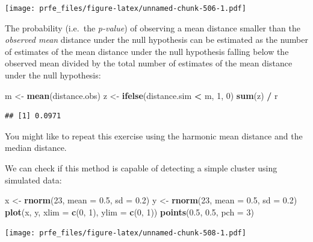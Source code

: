 \documentclass[12pt,a4paper]{book}
\newenvironment{Shaded}{\begin{snugshade}}{\end{snugshade}}
\newcommand{\DataTypeTok}[1]{\textcolor[rgb]{0.13,0.29,0.53}{#1}}
\newcommand{\DecValTok}[1]{\textcolor[rgb]{0.00,0.00,0.81}{#1}}
\newcommand{\FloatTok}[1]{\textcolor[rgb]{0.00,0.00,0.81}{#1}}
\newcommand{\KeywordTok}[1]{\textcolor[rgb]{0.13,0.29,0.53}{\textbf{#1}}}
\newcommand{\NormalTok}[1]{#1}
\newcommand{\OperatorTok}[1]{\textcolor[rgb]{0.81,0.36,0.00}{\textbf{#1}}}
\newcommand{\StringTok}[1]{\textcolor[rgb]{0.31,0.60,0.02}{#1}}
\theoremstyle{definition}
\theoremstyle{definition}
\theoremstyle{definition}
\theoremstyle{remark}
\begin{document}
\texttt{[image: prfe\_files/figure-latex/unnamed-chunk-506-1.pdf]}

The probability (i.e.~the \emph{p-value}) of observing a mean distance
smaller than the \emph{observed mean} distance under the null hypothesis
can be estimated as the number of estimates of the mean distance under
the null hypothesis falling below the observed mean divided by the total
number of estimates of the mean distance under the null hypothesis:

\begin{Shaded}
\begin{Highlighting}[]
\NormalTok{m <-}\StringTok{ }\KeywordTok{mean}\NormalTok{(distance.obs)}
\NormalTok{z <-}\StringTok{ }\KeywordTok{ifelse}\NormalTok{(distance.sim }\OperatorTok{<}\StringTok{ }\NormalTok{m, }\DecValTok{1}\NormalTok{, }\DecValTok{0}\NormalTok{)}
\KeywordTok{sum}\NormalTok{(z) }\OperatorTok{/}\StringTok{ }\NormalTok{r}
\end{Highlighting}
\end{Shaded}

\begin{verbatim}
## [1] 0.0971
\end{verbatim}

You might like to repeat this exercise using the harmonic mean distance
and the median distance.

We can check if this method is capable of detecting a simple cluster
using simulated data:

\begin{Shaded}
\begin{Highlighting}[]
\NormalTok{x <-}\StringTok{ }\KeywordTok{rnorm}\NormalTok{(}\DecValTok{23}\NormalTok{, }\DataTypeTok{mean =} \FloatTok{0.5}\NormalTok{, }\DataTypeTok{sd =} \FloatTok{0.2}\NormalTok{)}
\NormalTok{y <-}\StringTok{ }\KeywordTok{rnorm}\NormalTok{(}\DecValTok{23}\NormalTok{, }\DataTypeTok{mean =} \FloatTok{0.5}\NormalTok{, }\DataTypeTok{sd =} \FloatTok{0.2}\NormalTok{)}
\KeywordTok{plot}\NormalTok{(x, y, }\DataTypeTok{xlim =} \KeywordTok{c}\NormalTok{(}\DecValTok{0}\NormalTok{, }\DecValTok{1}\NormalTok{), }\DataTypeTok{ylim =} \KeywordTok{c}\NormalTok{(}\DecValTok{0}\NormalTok{, }\DecValTok{1}\NormalTok{))}
\KeywordTok{points}\NormalTok{(}\FloatTok{0.5}\NormalTok{, }\FloatTok{0.5}\NormalTok{, }\DataTypeTok{pch =} \DecValTok{3}\NormalTok{)}
\end{Highlighting}
\end{Shaded}

\texttt{[image: prfe\_files/figure-latex/unnamed-chunk-508-1.pdf]}
\end{document}
